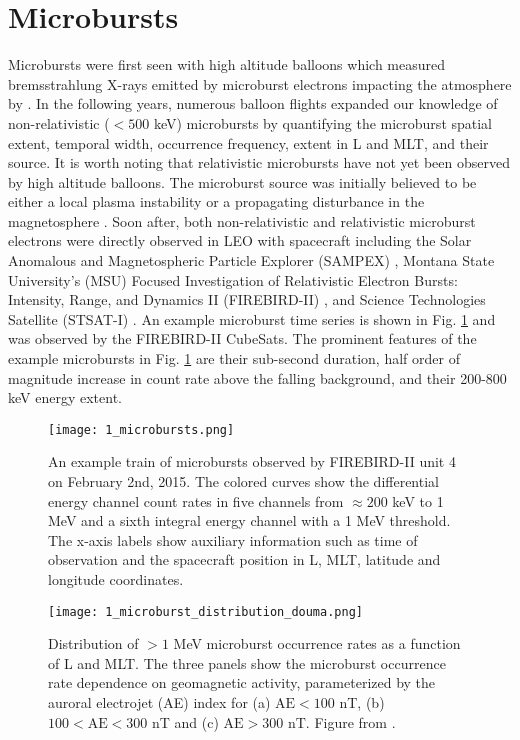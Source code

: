 \section{Microbursts}\label{Intro:microbursts}
Microbursts were first seen with high altitude balloons which measured bremsstrahlung X-rays emitted by microburst electrons impacting the atmosphere by \citet{Anderson1964}. In the following years, numerous balloon flights expanded our knowledge of non-relativistic ($< 500$ keV) microbursts by quantifying the microburst spatial extent, temporal width, occurrence frequency, extent in L and MLT, and their source. It is worth noting that relativistic microbursts have not yet been observed by high altitude balloons. The microburst source was initially believed to be either a local plasma instability or a propagating disturbance in the magnetosphere \citep{Trefall1966, Brown1965_2, Barcus1966, Parks1967}. Soon after, both non-relativistic and relativistic microburst electrons were directly observed in LEO with spacecraft including the Solar Anomalous and Magnetospheric Particle Explorer (SAMPEX) \citep[e.g.][]{Blake1996, Blum2015, Lorentzen2001a, Lorentzen2001b, Nakamura1995, Nakamura2000, O'Brien2003, O'Brien2004, Greeley2019, Douma2017, Douma2019},  Montana State University's (MSU) Focused Investigation of Relativistic Electron Bursts: Intensity, Range, and Dynamics II (FIREBIRD-II) \citep{Spence2012, Klumpar2015, Crew2016, Anderson2017, Breneman2017}, and Science Technologies Satellite (STSAT-I) \citep[e.g.][]{Lee2005, Lee2012}. An example microburst time series is shown in Fig. \ref{Intro:microbursts} and was observed by the FIREBIRD-II CubeSats. The prominent features of the example microbursts in Fig. \ref{Intro:microbursts} are their sub-second duration, half order of magnitude increase in count rate above the falling background, and their 200-800 keV energy extent.

\begin{figure}
\texttt{[image: 1\_microbursts.png]}
\caption{An example train of microbursts observed by FIREBIRD-II unit 4 on February 2nd, 2015. The colored curves show the differential energy channel count rates in five channels from $\approx 200$ keV to 1 MeV and a sixth integral energy channel with a 1 MeV threshold. The x-axis labels show auxiliary information such as time of observation and the spacecraft position in L, MLT, latitude and longitude coordinates.}
\label{Intro:microbursts}
\end{figure}

\begin{figure}
\texttt{[image: 1\_microburst\_distribution\_douma.png]}
\caption{Distribution of $> 1$ MeV microburst occurrence rates as a function of L and MLT. The three panels show the microburst occurrence rate dependence on geomagnetic activity, parameterized by the auroral electrojet (AE) index for (a) $\mathrm{AE} < 100$ nT, (b) $100 < \mathrm{AE} < 300$ nT and (c) $\mathrm{AE} > 300$ nT. Figure from \citet{Douma2017}.}
\label{Intro:microburst_distribution}
\end{figure}

